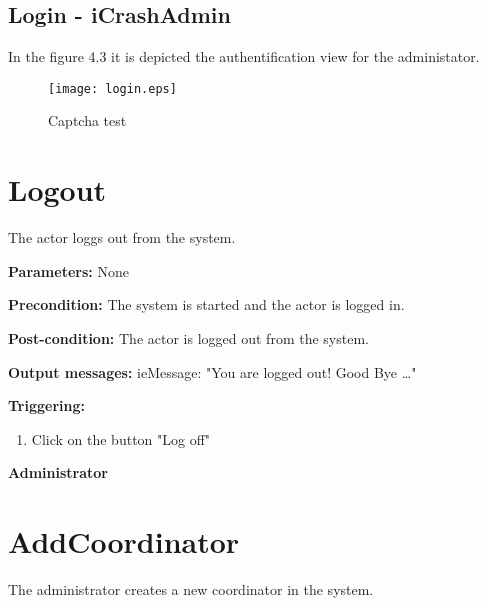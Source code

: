 \subsection{Login - iCrashAdmin}

In the figure 4.3 it is depicted the authentification view  for the
administator.
\begin{figure}[h]
    \texttt{[image: login.eps]}
	\caption{Captcha test}
\end{figure}

\section{Logout}
\label{operation:Logout}

The actor loggs out from the system.

\begin{description}
	\item \textbf{Parameters:} None
	\item \textbf{Precondition:} The system is started and the actor is logged in.
	\item \textbf{Post-condition:} The actor is logged out from the system.
	\item \textbf{Output messages:} ieMessage: "You are logged out! Good Bye
	\ldots"
	
	\item \textbf{Triggering:}
	
	\begin{enumerate}
		\item Click on the button "Log off"
	\end{enumerate}
\end{description}

\begin{center}
	{\bf \Large Administrator}
\end{center}

\section{AddCoordinator}
\label{operation:AddCoordinator}

The administrator creates a new coordinator in the system.

